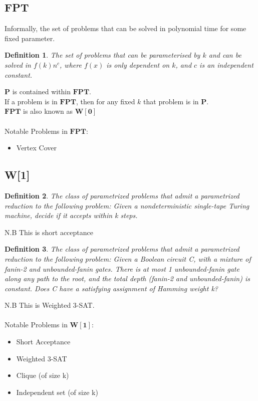 \documentclass[]{article}
\theoremstyle{break}
\theoremstyle{break}
\newtheorem{definition}{Definition}[section]
\begin{document}
\subsection{FPT}
\label{sec:FPT}
Informally, the set of problems that can be solved in polynomial time for some fixed parameter.
\\
\begin{definition}
	The set of problems that can be parameterised by $k$ and can be solved in $f(k)n^c$, where $f(x)$ is only dependent on $k$, and $c$ is an independent constant.
\end{definition}
$ $
\\
\hyperref[sec:P]{$\mathbf{P}$} is contained within $\mathbf{FPT}$.
\\
If a problem is in $\mathbf{FPT}$, then for any fixed $k$ that problem is in \hyperref[sec:P]{$\mathbf{P}$}.
\\
$\mathbf{FPT}$ is also known as \hyperref[sec:W]{$\mathbf{W[0]}$}
$ $
\\
\\
Notable Problems in $\mathbf{FPT}$:
\begin{itemize}
	\item Vertex Cover
\end{itemize}
\subsection{W[1]}
\label{sec:W[1]}

\begin{definition}
	The class of parametrized problems that admit a parametrized reduction to the following problem:
	Given a	nondeterministic single-tape Turing machine, decide if it accepts within k steps.
\end{definition}
N.B This is short acceptance
\begin{definition}
	The class of parametrized problems that admit a parametrized reduction to the following problem:
	Given a Boolean circuit C, with a mixture of fanin-2 and unbounded-fanin gates. There is at most 1 unbounded-fanin gate along any path to the root, and the total depth (fanin-2 and unbounded-fanin) is constant. Does C have a satisfying assignment of Hamming weight k?
\end{definition}
N.B This is Weighted 3-SAT.
\\
\\
Notable Problems in $\mathbf{W[1]}$:
\begin{itemize}
	\item Short Acceptance
	\item Weighted 3-SAT
	\item Clique (of size k)
	\item Independent set (of size k)
\end{itemize}
\end{document}
